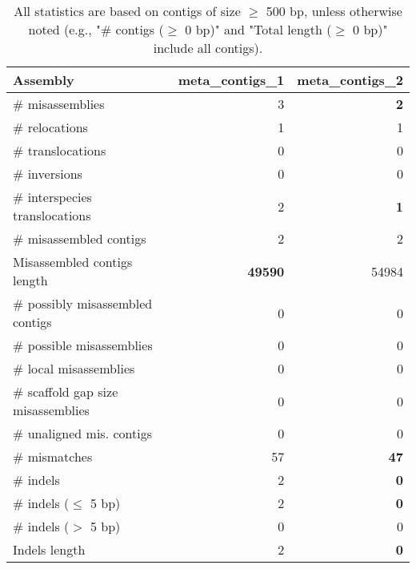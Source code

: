 \documentclass[12pt,a4paper]{article}
\begin{document}
\begin{table}[ht]
\begin{center}
\caption{All statistics are based on contigs of size $\geq$ 500 bp, unless otherwise noted (e.g., "\# contigs ($\geq$ 0 bp)" and "Total length ($\geq$ 0 bp)" include all contigs).}
\begin{tabular}{|l*{2}{|r}|}
\hline
Assembly & meta\_contigs\_1 & meta\_contigs\_2 \\ \hline
\# misassemblies & 3 & {\bf 2} \\ \hline
\hspace{5mm}\# relocations & 1 & 1 \\ \hline
\hspace{5mm}\# translocations & 0 & 0 \\ \hline
\hspace{5mm}\# inversions & 0 & 0 \\ \hline
\hspace{5mm}\# interspecies translocations & 2 & {\bf 1} \\ \hline
\# misassembled contigs & 2 & 2 \\ \hline
Misassembled contigs length & {\bf 49590} & 54984 \\ \hline
\# possibly misassembled contigs & 0 & 0 \\ \hline
\hspace{5mm}\# possible misassemblies & 0 & 0 \\ \hline
\# local misassemblies & 0 & 0 \\ \hline
\# scaffold gap size misassemblies & 0 & 0 \\ \hline
\# unaligned mis. contigs & 0 & 0 \\ \hline
\# mismatches & 57 & {\bf 47} \\ \hline
\# indels & 2 & {\bf 0} \\ \hline
\hspace{5mm}\# indels ($\leq$ 5 bp) & 2 & {\bf 0} \\ \hline
\hspace{5mm}\# indels ($>$ 5 bp) & 0 & 0 \\ \hline
Indels length & 2 & {\bf 0} \\ \hline
\end{tabular}
\end{center}
\end{table}
\end{document}
